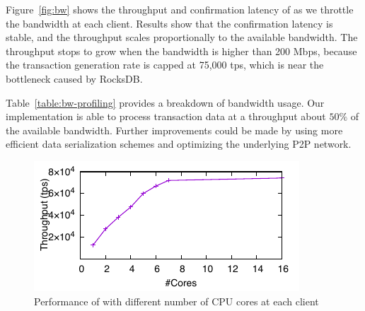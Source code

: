 \begin{table}[ht]
\centering
\caption{\small Network bandwidth usage breakdown of \prism measured on a 200 Mbps interface. Network Headroom is the unused bandwidth necessary for the block propagation delay to stay stable. Serialization overhead is wasted space when serializing in-memory objects for network transmission. Messaging stands for non-block messages.}

\label{table:bw-profiling}
\end{table}

 Figure~\ref{fig:bw} shows the throughput and confirmation latency of \prism as we throttle the bandwidth at each client. Results show that the confirmation latency is stable, and the throughput scales proportionally to the available bandwidth. The throughput stops to grow when the bandwidth is higher than 200 Mbps, because the transaction generation rate is capped at 75,000 tps, which is near the bottleneck caused by RocksDB.

Table~\ref{table:bw-profiling} provides a breakdown of bandwidth usage. Our implementation is able to process transaction data at a throughput about $50\%$ of the available bandwidth. Further improvements could be made by using more efficient data serialization schemes and optimizing the underlying P2P network.

\begin{figure}
    \centering
    \includegraphics{figures/resource-fig-cpu.pdf}
        \vspace{-3mm}
\caption{\small Performance of \prism with different number of CPU cores at each client}
    \label{fig:cpu}
    \vspace{-3mm}
\end{figure}

